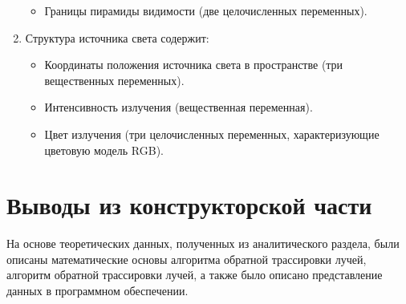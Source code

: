 \begin{enumerate}[label=\arabic*)]
\begin{itemize}[label=---]
		\item Границы пирамиды видимости (две целочисленных переменных).
	\end{itemize}
	\item Структура источника света содержит:
	\begin{itemize}[label=---]
		\item Координаты положения источника света в пространстве (три вещественных переменных).
		\item Интенсивность излучения (вещественная переменная).
		\item Цвет излучения (три целочисленных переменных, характеризующие цветовую модель RGB).
	\end{itemize}
\end{enumerate}

\section{Выводы из конструкторской части}

На основе теоретических данных, полученных из аналитического раздела,
были описаны математические основы алгоритма обратной трассировки лучей, алгоритм обратной трассировки лучей,
а также было описано представление данных в программном обеспечении.
